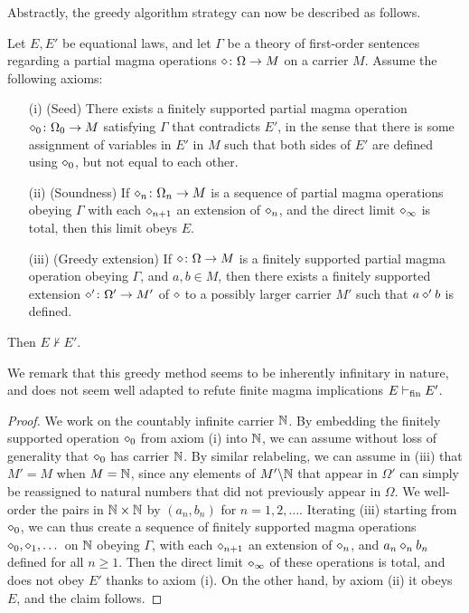 Abstractly, the greedy algorithm strategy can now be described as follows.

\begin{theorem}\label{greedy-abstract} Let $E,E'$ be equational laws, and let $\Gamma$ be a theory of first-order sentences regarding a  partial magma operations $\diamond \colon \Omega \to M$ on a carrier $M$.  Assume the following axioms:
\begin{itemize}
  \item[(i)] (Seed) There exists a finitely supported partial magma operation $\diamond_0 \colon \Omega_0 \to M$ satisfying $\Gamma$ that contradicts $E'$, in the sense that there is some assignment of variables in $E'$ in $M$ such that both sides of $E'$ are defined using $\diamond_0$, but not equal to each other.
  \item[(ii)]  (Soundness)  If $\diamond_n \colon \Omega_n \to M$ is a sequence of partial magma operations obeying $\Gamma$ with each $\diamond_{n+1}$ an extension of $\diamond_n$, and the direct limit $\diamond_\infty$ is total, then this limit obeys $E$.
  \item[(iii)] (Greedy extension)  If $\diamond \colon \Omega \to M$ is a finitely supported partial magma operation obeying $\Gamma$, and $a,b \in M$, then there exists a finitely supported extension $\diamond' \colon \Omega' \to M'$ of $\diamond$ to a possibly larger carrier $M'$ such that $a \diamond' b$ is defined.
\end{itemize}
Then $E \not \vdash E'$.
\end{theorem}

We remark that this greedy method seems to be inherently infinitary in nature, and does not seem well adapted to refute finite magma implications $E \vdash_{\mathrm{fin}} E'$.

\begin{proof}  We work on the countably infinite carrier $\mathbb{N}$.  By embedding the finitely supported operation $\diamond_0$ from axiom (i) into $\mathbb{N}$, we can assume without loss of generality that $\diamond_0$ has carrier $\mathbb{N}$.  By similar relabeling, we can assume in (iii) that $M' = M$ when $M=\mathbb{N}$, since any elements of $M' \backslash \mathbb{N}$ that
appear in $\Omega'$ can simply be reassigned to natural numbers that did not previously appear in $\Omega$.  We well-order the pairs in $\mathbb{N} \times \mathbb{N}$ by $(a_n,b_n)$ for $n=1,2,\dots$.  Iterating (iii) starting from $\diamond_0$, we can thus create a sequence of finitely supported magma operations $\diamond_0, \diamond_1, \dots$ on $\mathbb{N}$ obeying $\Gamma$, with each $\diamond_{n+1}$ an extension of $\diamond_n$, and $a_n \diamond_n b_n$ defined for all $n \geq 1$.  Then the direct limit $\diamond_\infty$ of these operations is total, and does not obey $E'$ thanks to axiom (i).  On the other hand, by axiom (ii) it obeys $E$, and the claim follows.
\end{proof}

